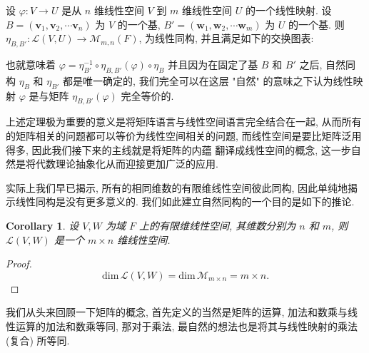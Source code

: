 \documentclass[UTF8]{book}
\newtheorem{corollary}{Corollary}[section]
\begin{document}
\begin{theorem}
设 $\varphi : V \to U$ 是从 $n$ 维线性空间 $V$ 到 $m$ 维线性空间 $U$ 
的一个线性映射. 
设 $B=(\boldsymbol{v}_1,\boldsymbol{v}_2,\cdots\boldsymbol{v}_n)$ 
为 $V$ 的一个基, 
$B' = (\boldsymbol{w}_1,\boldsymbol{w}_2,\cdots\boldsymbol{w}_m)$ 
为 $U$ 的一个基. 
则 $\eta_{B,B'}: \mathcal{L}(V,U) \to \mathcal{M}_{m,n}(F)$, 
为线性同构, 并且满足如下的交换图表: 
\begin{center}
\end{center}
也就意味着 
$\varphi = \eta_{B'}^{-1} \circ \eta_{B,B'}(\varphi) \circ \eta_{B}$ 
并且因为在固定了基 $B$ 和 $B'$ 之后, 
自然同构 $\eta_{B}$ 和 $\eta_{B'}$ 都是唯一确定的, 
我们完全可以在这层 "自然" 的意味之下认为线性映射 $\varphi$ 
是与矩阵 $\eta_{B,B'}(\varphi)$ 完全等价的. 
\end{theorem} 

上述定理极为重要的意义是将矩阵语言与线性空间语言完全结合在一起, 
从而所有的矩阵相关的问题都可以等价为线性空间相关的问题, 
而线性空间是要比矩阵泛用得多, 因此我们接下来的主线就是将矩阵的内蕴
翻译成线性空间的概念, 这一步自然是将代数理论抽象化从而迎接更加广泛的应用. 

实际上我们早已揭示, 所有的相同维数的有限维线性空间彼此同构, 
因此单纯地揭示线性同构是没有更多意义的. 
我们如此建立自然同构的一个目的是如下的推论. 

\begin{corollary}
    设 $V,W$ 为域 $F$ 上的有限维线性空间, 
    其维数分别为 $n$ 和 $m$, 则 
    $\mathcal{L}(V,W)$ 是一个 $m\times n$ 维线性空间. 
\end{corollary}

\begin{proof}
    $$\mathrm{dim}\,\mathcal{L}(V,W) = 
    \mathrm{dim} \, \mathcal{M}_{m \times n} = m \times n.$$
\end{proof}

我们从头来回顾一下矩阵的概念, 首先定义的当然是矩阵的运算, 
加法和数乘与线性运算的加法和数乘等同, 那对于乘法, 
最自然的想法也是将其与线性映射的乘法 (复合) 所等同. 
\end{document}

